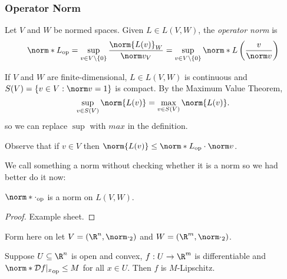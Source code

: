 \documentclass[a4paper]{article}
\newcommand*{\D}{\mathcal{D}}
\newcommand*{\nop}[1]{\norm*{#1}_{\text{op}}}
\theoremstyle{definition}
\begin{document}
\subsubsection{Operator Norm}

\begin{definition}
  Let \(V\) and \(W\) be normed spaces. Given \(L \in L(V, W)\), the \emph{operator norm} is
  \[
    \nop L = \sup_{v \in V\setminus \{0\}} \frac{\norm{L(v)}_W}{\norm v_V} = \sup_{v \in V \setminus \{0\}} \norm*{ L\left( \frac{v}{\norm v} \right)}
    \]
\end{definition}

\begin{remark}
  If \(V\) and \(W\) are finite-dimensional, \(L \in L(V, W)\) is continuous and \(S(V) = \{v \in V: \norm v = 1\}\) is compact. By the Maximum Value Theorem,
  \[
    \sup_{v \in S(V)} \norm{L(v)} = \max_{v \in S(V)} \norm{L(v)}.
  \]
  so we can replace \(\sup\) with \(max\) in the definition.
\end{remark}

Observe that if \(v \in V\) then \(\norm{L(v)} \leq \nop L \cdot \norm v\).

We call something a norm without checking whether it is a norm so we had better do it now:

\begin{proposition}
  \(\nop \cdot\) is a norm on \(L(V, W)\).
\end{proposition}

\begin{proof}\leavevmode
  Example sheet.
\end{proof}

Form here on let \(V = (\R^n, \norm \cdot_2)\) and \(W = (\R^m, \norm \cdot_2)\).

\begin{proposition}
  \label{prop:operator norm bounded implies Lipschitz}
  Suppose \(U \subseteq \R^n\) is open and convex, \(f: U \to \R^m\) is differentiable and \(\nop{\D f|_x} \leq M\) for all \(x \in U\). Then \(f\) is \(M\)-Lipschitz.
\end{proposition}
\end{document}
